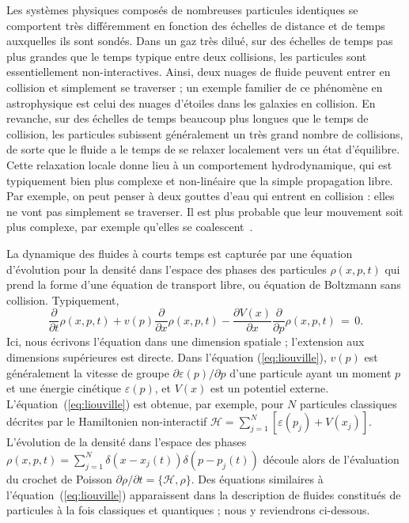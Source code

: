 Les systèmes physiques composés de nombreuses particules identiques se comportent très différemment en fonction des échelles de distance et de temps auxquelles ils sont sondés. Dans un gaz très dilué, sur des échelles de temps pas plus grandes que le temps typique entre deux collisions, les particules sont essentiellement non-interactives. Ainsi, deux nuages de fluide peuvent entrer en collision et simplement se traverser ; un exemple familier de ce phénomène en astrophysique est celui des nuages d'étoiles dans les galaxies en collision. En revanche, sur des échelles de temps beaucoup plus longues que le temps de collision, les particules subissent généralement un très grand nombre de collisions, de sorte que le fluide a le temps de se relaxer localement vers un état d'équilibre. Cette relaxation locale donne lieu à un comportement hydrodynamique, qui est typiquement bien plus complexe et non-linéaire que la simple propagation libre. Par exemple, on peut penser à deux gouttes d'eau qui entrent en collision : elles ne vont pas simplement se traverser. Il est plus probable que leur mouvement soit plus complexe, par exemple qu'elles se coalescent~\citep{brazier1972interaction}.


\vspace{0.5cm}




La dynamique des fluides à courts temps est capturée par une équation d'évolution pour la densité dans l'espace des phases des particules $\rho(x,p,t)$ qui prend la forme d'une équation de transport libre, ou équation de Boltzmann sans collision. Typiquement,
\begin{equation}
	\label{eq:liouville}
	\frac{\partial}{\partial t} \rho(x,p,t)  + v(p)  \frac{\partial}{\partial x} \rho(x,p,t) -   \frac{\partial  V(x)}{\partial x}  \frac{\partial}{\partial p} \rho(x,p,t)   \, = \, 0.
\end{equation}
Ici, nous écrivons l'équation dans une dimension spatiale ; l'extension aux dimensions supérieures est directe. Dans l'équation (\ref{eq:liouville}), $v(p)$ est généralement la vitesse de groupe $ \partial \varepsilon(p)/\partial p$ d'une particule ayant un moment $p$ et une énergie cinétique $\varepsilon(p)$, et $V(x)$ est un potentiel externe. L'équation~(\ref{eq:liouville}) est obtenue, par exemple, pour $N$ particules classiques décrites par le Hamiltonien non-interactif $\mathcal{H} = \sum_{j=1}^N [ \varepsilon(p_j) + V(x_j) ]$. L'évolution de la densité dans l'espace des phases $\rho(x,p,t) = \sum_{j=1}^N  \delta(x - x_j(t) ) \delta(p-p_j(t))$ découle alors de l'évaluation du crochet de Poisson $\partial \rho / \partial t = \{ \mathcal{H}, \rho  \}$. Des équations similaires à l'équation~(\ref{eq:liouville}) apparaissent dans la description de fluides constitués de particules à la fois classiques et quantiques ; nous y reviendrons ci-dessous.


